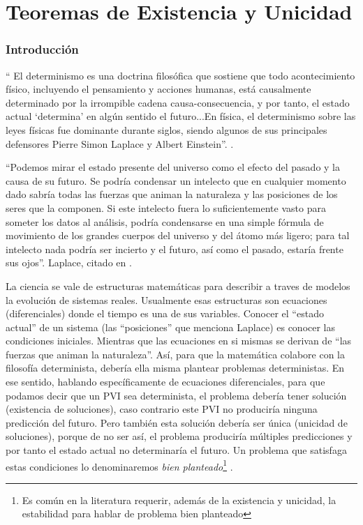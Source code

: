 \chapter{Teoremas de Existencia y Unicidad}



\subsection{Introducción}


 \enquote{
 El determinismo es una doctrina filosófica que sostiene que todo acontecimiento físico, incluyendo el pensamiento y acciones humanas, está causalmente determinado por la irrompible cadena causa-consecuencia, y por tanto, el estado actual \enquote{determina} en algún sentido el futuro...En física, el determinismo sobre las leyes físicas fue dominante durante siglos, siendo algunos de sus principales defensores Pierre Simon Laplace y Albert Einstein}. \cite{ wiki:determinismo}.
 
\enquote{Podemos mirar el estado presente del universo como el efecto del pasado y la causa de su futuro. Se podría condensar un intelecto que en cualquier momento dado sabría todas las fuerzas que animan la naturaleza y las posiciones de los seres que la componen. Si este intelecto fuera lo suficientemente vasto para someter los datos al análisis, podría condensarse en una simple fórmula de movimiento de los grandes cuerpos del universo y del átomo más ligero; para tal intelecto nada podría ser incierto y el futuro, así como el pasado, estaría frente sus ojos}. Laplace, citado en \cite{ wiki:determinismo}.

La ciencia se vale de estructuras matemáticas para describir a traves de modelos la evolución de sistemas reales. Usualmente esas estructuras son ecuaciones (diferenciales) donde el tiempo es una de sus variables. Conocer el \enquote{estado actual} de un sistema (las \enquote{posiciones} que menciona Laplace) es conocer las condiciones iniciales. Mientras que las ecuaciones en si mismas se derivan de  \enquote{las fuerzas que animan la naturaleza}.  Así, para que la matemática colabore con la filosofía determinista, debería ella misma plantear problemas deterministas.  En ese sentido, hablando específicamente de ecuaciones diferenciales, para que podamos decir que un PVI sea determinista, el problema debería tener solución (existencia de soluciones), caso contrario este PVI no produciría ninguna predicción del futuro. Pero también esta solución debería ser única (unicidad de soluciones), porque de no ser así, el problema produciría múltiples predicciones y por tanto el estado actual 
no determinaría el futuro. Un problema que satisfaga estas condiciones lo denominaremos \emph{bien planteado}\footnote{Es común en la literatura requerir, además de la existencia y unicidad, la estabilidad para hablar de problema bien planteado} . 


